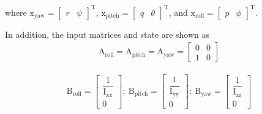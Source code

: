 \documentclass[3p,times]{elsarticle}
\begin{document}
where $\boldsymbol{\mathrm{x}}_{\text{yaw}} = \begin{bmatrix}
	r & \psi
\end{bmatrix}^\mathrm{T}$, $\boldsymbol{\mathrm{x}}_{\text{pitch}} = \begin{bmatrix}
	q & \theta \end{bmatrix}^\mathrm{T}$, and $\boldsymbol{\mathrm{x}}_{\text{roll}} = \begin{bmatrix}
		p & \phi
	\end{bmatrix}^\mathrm{T}$.



In addition, the input matrices and state are shown as
\begin{equation}
	\begin{split}
		\boldsymbol{\mathrm{A}}_{\text{roll}}  =\boldsymbol{\mathrm{A}}_{\text{pitch}}  = \boldsymbol{\mathrm{A}}_{\text{yaw}}  = \begin{bmatrix}
			0 & 0\\
			1 & 0
		\end{bmatrix}
	\end{split}
\end{equation}

\begin{equation}
	\begin{split}
		\boldsymbol{\mathrm{B}}_{\text{roll}}  = \begin{bmatrix}
			\dfrac{1}{\mathrm{I}_{\text{xx}}}
			\\[1em]
			0
		\end{bmatrix};~ \boldsymbol{\mathrm{B}}_{\text{pitch}}  = \begin{bmatrix}
			\dfrac{1}{\mathrm{I}_{\text{yy}}}
			\\[1em]
			0
		\end{bmatrix};~ \boldsymbol{\mathrm{B}}_{\text{yaw}}  = \begin{bmatrix}
			\dfrac{1}{\mathrm{I}_{\text{zz}}}
			\\[1em]
			0
		\end{bmatrix}
	\end{split}
\end{equation}
\end{document}
